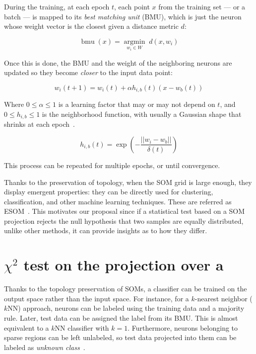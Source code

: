 During the training, at each epoch $t$, each point $x$ from the training set
--- or a batch --- is mapped to its \emph{best matching unit} (BMU), which is
just the neuron whose weight vector is the closest given a distance metric $d$:

\begin{equation}
    \operatorname{bmu}(x) = \underset{w_i \in W}{\operatorname{argmin}} \; d(x, w_i)
\end{equation}

Once this is done, the BMU and the weight of the neighboring neurons are updated so they become
\emph{closer} to the input data point:

\begin{equation}
    w_i(t + 1) = w_i(t) + \alpha h_{i,b}(t) (x - w_b(t))
\end{equation}

Where $0 \le \alpha \le 1$ is a learning factor that may or may not depend on $t$,
and $0 \le h_{i,b} \le 1$ is the neighborhood function, with usually a Gaussian shape
that shrinks at each epoch~\cite{Villmann1999,wittek2013somoclu}.

\begin{equation}
    h_{i,b}(t) = \exp(- \frac{||w_i - w_b||}{\delta(t)})
\end{equation}

This process can be repeated for multiple epochs, or until convergence.

\medskip

Thanks to the preservation of topology, when the \gls{SOM}  grid is large enough,
they display emergent properties: they can be directly used for clustering,
classification, and other machine learning techniques. These are referred as
\gls{ESOM}~\cite{ultsch2005esom}.
This motivates our proposal since if a statistical test based on a \gls{SOM}
projection rejects the null hypothesis that two samples are equally distributed,
unlike other methods, it can provide insights as to how they differ.

\section{\texorpdfstring{$\chi^2$}{χ²} test on the projection over a }
\label{sec:som_chi2}

Thanks to the topology preservation of \glspl{SOM}, a classifier can be trained
on the output space rather than the input space. For instance, for a $k$-nearest neighbor ($k$NN)
approach, neurons can be labeled using the training data and a majority rule. Later, test data
can be assigned the label from its BMU. This is almost equivalent to a $k$NN classifier with $k=1$.
Furthermore, neurons belonging to sparse regions can be left unlabeled, so test data projected
into them can be labeled as \emph{unknown class}~\cite{ultsch2005esom,silva2011som}.

